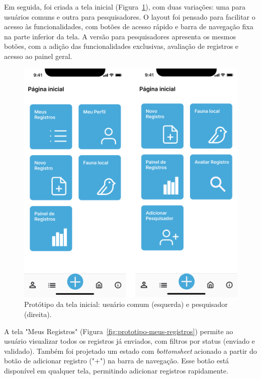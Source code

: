 Em seguida, foi criada a tela inicial (Figura~\ref{fig:prototipo-home}), com duas 
variações: uma para usuários comuns e outra para pesquisadores. O layout foi pensado 
para facilitar o acesso às funcionalidades, com botões de acesso rápido e 
barra de navegação fixa na parte inferior da tela. A versão para pesquisadores apresenta os mesmos botões,
com a adição das funcionalidades exclusivas, avaliação de registros e acesso ao painel geral.

\begin{figure}[H]
    \centering
    \includegraphics[height=0.6\textheight]{imagens/menu-pesquisador-figma.png}
    \caption{Protótipo da tela inicial: usuário comum (esquerda) e pesquisador (direita).}
    \label{fig:prototipo-home}
\end{figure}

A tela "Meus Registros" (Figura~\ref{fig:prototipo-meus-registros}) permite ao usuário 
visualizar todos os registros já enviados, com filtros por status (enviado e validado). 
Também foi projetado um estado com \textit{bottomsheet} acionado a partir do botão de adicionar 
registro ("+") na barra de navegação. Esse botão está disponível em qualquer tela, permitindo 
adicionar registros rapidamente.

